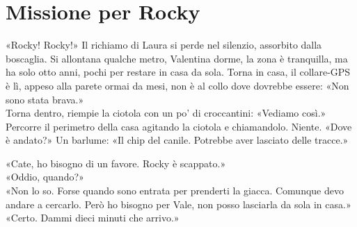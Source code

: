 \chapter{Missione per Rocky}

«Rocky! Rocky!» Il richiamo di Laura si perde nel silenzio, assorbito dalla boscaglia. Si allontana qualche metro, Valentina dorme, la zona \`e tranquilla, ma ha solo otto anni, pochi per restare in casa da sola. Torna in casa, il collare-GPS \`e l\`i, appeso alla parete ormai da mesi, non \`e al collo dove dovrebbe essere: «Non sono stata brava.»\\
Torna dentro, riempie la ciotola con un po' di croccantini: «Vediamo cos\`i.» Percorre il perimetro della casa agitando la ciotola e chiamandolo. Niente. «Dove \`e andato?» Un barlume: «Il chip del canile. Potrebbe aver lasciato delle tracce.»


\par\medskip
«Cate, ho bisogno di un favore. Rocky \`e scappato.»\\
«Oddio, quando?»\\
«Non lo so. Forse quando sono entrata per prenderti la giacca. Comunque devo andare a cercarlo. Però ho bisogno per Vale, non posso lasciarla da sola in casa.»\\
«Certo. Dammi dieci minuti che arrivo.»

